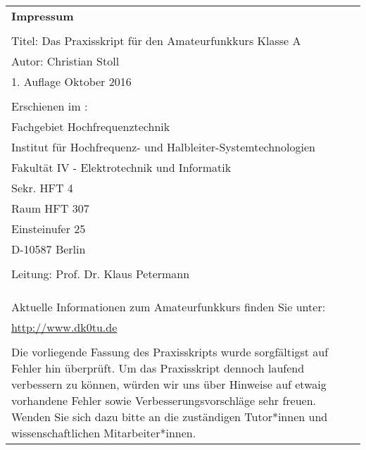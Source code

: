 \thispagestyle{empty}

\begin{tabular}{p{13cm} p{1cm}}
\textbf{Impressum} &\\
&\\
Titel: Das Praxisskript für den Amateurfunkkurs Klasse A&\\
Autor: Christian Stoll&\\
1. Auflage Oktober 2016 &\\
&\\
Erschienen im :&\\
Fachgebiet Hochfrequenztechnik &\\
Institut für Hochfrequenz- und Halbleiter-Systemtechnologien&\\
Fakultät IV - Elektrotechnik und Informatik &\\
Sekr. HFT 4 &\\
Raum HFT 307 &\\
Einsteinufer 25 &\\
D-10587 Berlin &\\
&\\
Leitung: Prof. Dr. Klaus Petermann &\\
&\\
&\\
&\\
Aktuelle Informationen zum Amateurfunkkurs finden Sie unter:  &\\
\url{http://www.dk0tu.de} &\\
&\\
Die vorliegende Fassung des Praxisskripts wurde sorgfältigst auf Fehler hin überprüft. Um das Praxisskript dennoch laufend verbessern zu können, würden wir uns über Hinweise auf etwaig vorhandene Fehler sowie Verbesserungsvorschläge sehr freuen. Wenden Sie sich dazu bitte an die zuständigen Tutor*innen und wissenschaftlichen Mitarbeiter*innen.&\\
\end{tabular}



